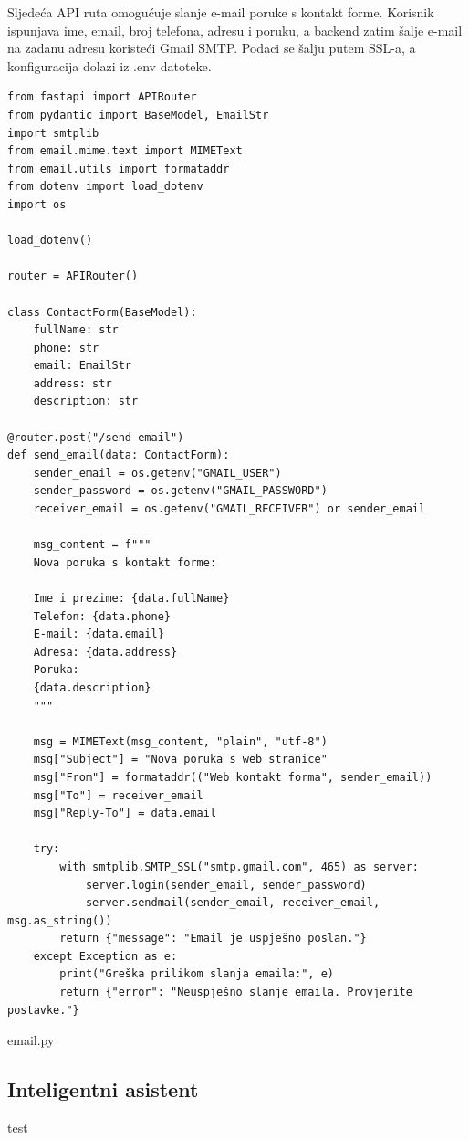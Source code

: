 \documentclass[]{foi}
\begin{document}
Sljedeća API ruta omogućuje slanje e-mail poruke s kontakt forme. Korisnik ispunjava ime, email, broj telefona, adresu i poruku, a backend
zatim šalje e-mail na zadanu adresu koristeći Gmail SMTP. Podaci se šalju putem SSL-a, a konfiguracija dolazi iz .env datoteke.

\begin{longlisting}
\begin{verbatim}
from fastapi import APIRouter
from pydantic import BaseModel, EmailStr
import smtplib
from email.mime.text import MIMEText
from email.utils import formataddr
from dotenv import load_dotenv
import os

load_dotenv()

router = APIRouter()

class ContactForm(BaseModel):
    fullName: str
    phone: str
    email: EmailStr
    address: str
    description: str

@router.post("/send-email")
def send_email(data: ContactForm):
    sender_email = os.getenv("GMAIL_USER")
    sender_password = os.getenv("GMAIL_PASSWORD")
    receiver_email = os.getenv("GMAIL_RECEIVER") or sender_email

    msg_content = f"""
    Nova poruka s kontakt forme:

    Ime i prezime: {data.fullName}
    Telefon: {data.phone}
    E-mail: {data.email}
    Adresa: {data.address}
    Poruka:
    {data.description}
    """

    msg = MIMEText(msg_content, "plain", "utf-8")
    msg["Subject"] = "Nova poruka s web stranice"
    msg["From"] = formataddr(("Web kontakt forma", sender_email))
    msg["To"] = receiver_email
    msg["Reply-To"] = data.email  

    try:
        with smtplib.SMTP_SSL("smtp.gmail.com", 465) as server:
            server.login(sender_email, sender_password)
            server.sendmail(sender_email, receiver_email, msg.as_string())
        return {"message": "Email je uspješno poslan."}
    except Exception as e:
        print("Greška prilikom slanja emaila:", e)
        return {"error": "Neuspješno slanje emaila. Provjerite postavke."}
\end{verbatim}
\caption{email.py}
\label{lst:email}
\end{longlisting}


\subsection{Inteligentni asistent}
test
\end{document}
